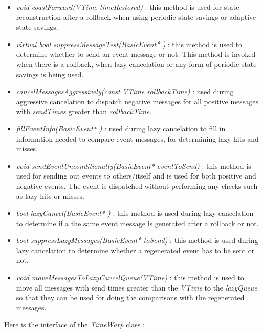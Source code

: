 \documentclass[11pt]{report}
\begin{document}
\begin{itemize}
\item
{\it void coastForward(VTime timeRestored)} : this method is used for state
reconstruction after a rollback when using periodic state savings or
adaptive state savings.

\item
{\it virtual bool suppressMessageTest(BasicEvent* )} : this method is used
to determine whether to send an event message or not. This method is
invoked when there is a rollback, when lazy cancelation or any form of
periodic state savings is being used.

\item
{\it cancelMessagesAggressively(const VTime rollbackTime)} : used during
aggressive cancelation to dispatch negative messages for all positive
messages with {\it sendTimes} greater than {\it rollbackTime}.

\item
{\it fillEventInfo(BasicEvent* )} : used during lazy cancelation to fill in
information needed to compare event messages, for determining lazy hits
and misses.

\item
{\it void sendEventUnconditionally(BasicEvent* eventToSend)} : this
method is used for sending out events to others/itself and is used for
both positive and negative events. The event is dispatched without
performing any checks such as lazy hits or misses.

\item
{\it bool lazyCancel(BasicEvent* )} : this method is used during lazy
cancelation to determine if a the same event message is generated after
a rollback or not.

\item
{\it bool suppressLazyMessages(BasicEvent* toSend)} : this method is used
during lazy cancelation to determine whether a regenerated event has
to be sent or not.

\item
{\it void moveMessagesToLazyCancelQueue(VTime)} : this method is used to
move all messages with send times greater than the {\it VTime} to the {\it
lazyQueue} so that they can be used for doing the comparisons with the
regenerated messages.

\end{itemize}

Here is the interface of the {\it TimeWarp} class :
\end{document}
